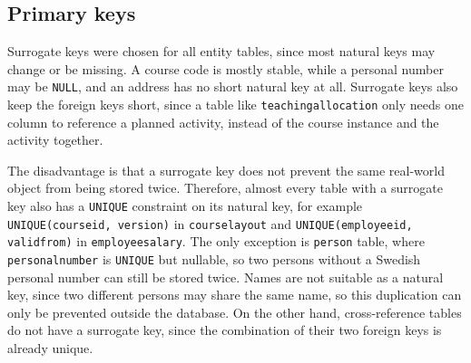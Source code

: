 \documentclass[a4paper]{scrartcl}
\renewcommand{\_}{\textunderscore\allowbreak}
\begin{document}


\subsection{Primary keys}

Surrogate keys were chosen for all entity tables, since most natural keys may change or be missing. A course code is mostly stable, while a personal number may be \texttt{NULL}, and an address has no short natural key at all. Surrogate keys also keep the foreign keys short, since a table like \texttt{teaching\_allocation} only needs one column to reference a planned activity, instead of the course instance and the activity together.

The disadvantage is that a surrogate key does not prevent the same real-world object from being stored twice. Therefore, almost every table with a surrogate key also has a \texttt{UNIQUE} constraint on its natural key, for example \texttt{UNIQUE(course\_id, version)} in \texttt{course\_layout} and \texttt{UNIQUE(employee\_id, valid\_from)} in \texttt{employee\_salary}.
The only exception is \texttt{person} table, where \texttt{personal\_number} is \texttt{UNIQUE} but nullable, so two persons without a Swedish personal number can still be stored twice. Names are not suitable as a natural key, since two different persons may share the same name, so this duplication can only be prevented outside the database. On the other hand, cross-reference tables do not have a surrogate key, since the combination of their two foreign keys is already unique.
\end{document}

